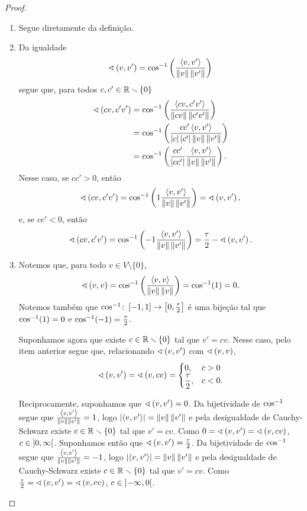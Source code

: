 \begin{proof}
	\begin{enumerate}
	\item Segue diretamente da definição.
	\item Da igualdade
	\begin{equation*}
	\ang{v}{v'} = \cos\inv\left(\frac{\inte{v}{v'}}{\nor{v}\nor{v'}}\right)
	\end{equation*}
segue que, para todos $c,c' \in \R\setminus\{0\}$
	\begin{align*}
	\ang{cv}{c'v'} &= \cos\inv\left(\frac{\inte{cv}{c'v'}}{\nor{cv}\nor{c'v'}}\right) \\
		&= \cos\inv\left(\frac{cc'\inte{v}{v'}}{\abs{c}\abs{c'}\nor{v}\nor{v'}}\right) \\
		&= \cos\inv\left(\frac{cc'}{\abs{cc'}}\frac{\inte{v}{v'}}{\nor{v}\nor{v'}}\right).
	\end{align*}
Nesse caso, se $cc' > 0$, então
	\begin{equation*}
	\ang{cv}{c'v'} = \cos\inv\left(1\frac{\inte{v}{v'}}{\nor{v}\nor{v'}}\right) = \ang{v}{v'},
	\end{equation*}
e, se $cc' < 0$, então
	\begin{equation*}
	\ang{cv}{c'v'} = \cos\inv\left(-1\frac{\inte{v}{v'}}{\nor{v}\nor{v'}}\right) = \frac{\tau}{2} - \ang{v}{v'}.
	\end{equation*}
	
	\item Notemos que, para todo $v \in V \setminus \{0\}$,
		\begin{equation*}
			\ang{v}{v} = \cos\inv\left(\frac{\inte{v}{v}}{\nor{v}\nor{v}}\right) = \cos\inv(1) = 0.
		\end{equation*}
Notemos também que $\cos\inv\colon \intff{-1}{1} \to \intff{0}{\frac{\tau}{2}}$ é uma bijeção tal que $\cos\inv(1)=0$ e $\cos\inv(-1) = \frac{\tau}{2}$.

Suponhamos agora que existe $c \in \R \setminus \{0\}$ tal que $v'=cv$. Nesse caso, pelo item anterior segue que, relacionando $\ang{v}{v'}$ com $\ang{v}{v}$,
		\begin{equation*}
		\ang{v}{v'} = \ang{v}{cv} = \begin{cases}
		0,& c>0 \\
		\displaystyle\frac{\tau}{2},& c<0.
	\end{cases}
		\end{equation*}

Reciprocamente, suponhamos que $\ang{v}{v'}=0$. Da bijetividade de $\cos\inv$ segue que $\frac{\inte{v}{v'}}{\nor{v}\nor{v'}} = 1$, logo $\abs{\inte{v}{v'}} = \nor{v}\nor{v'}$ e pela desigualdade de Cauchy-Schwarz existe $c \in \R \setminus \{0\}$ tal que $v'=cv$. Como $0 = \ang{v}{v'} = \ang{v}{cv}$, $c \in \intaa{0}{\infty}$. Suponhamos então que $\ang{v}{v'}=\frac{\tau}{2}$. Da bijetividade de $\cos\inv$ segue que $\frac{\inte{v}{v'}}{\nor{v}\nor{v'}} = -1$, logo $\abs{\inte{v}{v'}} = \nor{v}\nor{v'}$ e pela desigualdade de Cauchy-Schwarz existe $c \in \R \setminus \{0\}$ tal que $v'=cv$. Como $\frac{\tau}{2} = \ang{v}{v'} = \ang{v}{cv}$, $c \in \intaa{-\infty}{0}$.


\end{enumerate}
\end{proof}
